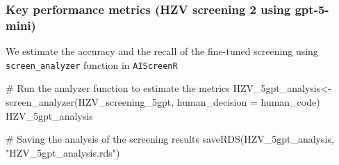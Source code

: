 \documentclass[
  letterpaper,
  DIV=11,
  numbers=noendperiod]{scrartcl}
\newenvironment{Shaded}{\begin{snugshade}}{\end{snugshade}}
\newcommand{\AttributeTok}[1]{\textcolor[rgb]{0.40,0.45,0.13}{#1}}
\newcommand{\CommentTok}[1]{\textcolor[rgb]{0.37,0.37,0.37}{#1}}
\newcommand{\FunctionTok}[1]{\textcolor[rgb]{0.28,0.35,0.67}{#1}}
\newcommand{\NormalTok}[1]{\textcolor[rgb]{0.00,0.23,0.31}{#1}}
\newcommand{\OtherTok}[1]{\textcolor[rgb]{0.00,0.23,0.31}{#1}}
\newcommand{\StringTok}[1]{\textcolor[rgb]{0.13,0.47,0.30}{#1}}
\begin{document}
\subsubsection{Key performance metrics (HZV screening 2 using
gpt-5-mini)}\label{key-performance-metrics-hzv-screening-2-using-gpt-5-mini}

We estimate the accuracy and the recall of the fine-tuned screening
using \texttt{screen\_analyzer} function in \texttt{AIScreenR}

\begin{Shaded}
\begin{Highlighting}[]
\CommentTok{\# Run the analyzer function to estimate the metrics}
\NormalTok{HZV\_5gpt\_analysis}\OtherTok{\textless{}{-}}\FunctionTok{screen\_analyzer}\NormalTok{(HZV\_screening\_5gpt, }\AttributeTok{human\_decision =}\NormalTok{ human\_code)}
\NormalTok{HZV\_5gpt\_analysis}

\CommentTok{\# Saving the analysis of the screening results}
\FunctionTok{saveRDS}\NormalTok{(HZV\_5gpt\_analysis, }\StringTok{"HZV\_5gpt\_analysis.rds"}\NormalTok{)}
\end{Highlighting}
\end{Shaded}
\end{document}
